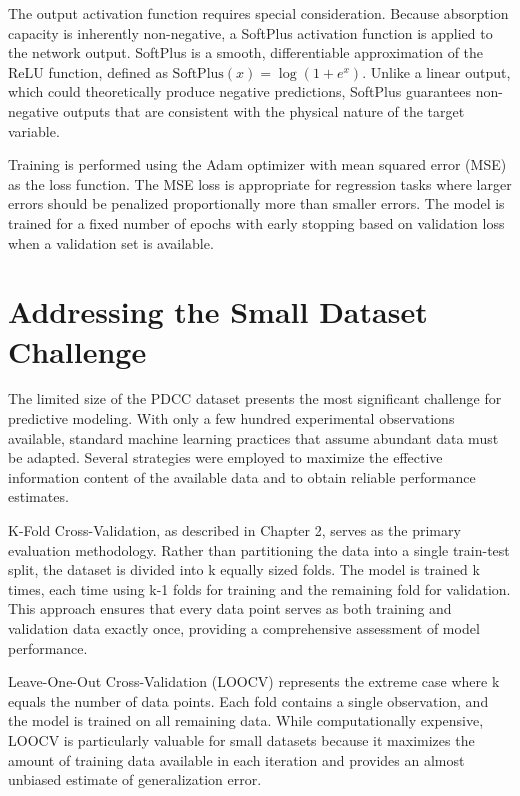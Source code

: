 The output activation function requires special consideration. Because absorption capacity is inherently non-negative, a SoftPlus activation function is applied to the network output. SoftPlus is a smooth, differentiable approximation of the ReLU function, defined as $\text{SoftPlus}(x) = \log(1 + e^x)$. Unlike a linear output, which could theoretically produce negative predictions, SoftPlus guarantees non-negative outputs that are consistent with the physical nature of the target variable.

Training is performed using the Adam optimizer with mean squared error (MSE) as the loss function. The MSE loss is appropriate for regression tasks where larger errors should be penalized proportionally more than smaller errors. The model is trained for a fixed number of epochs with early stopping based on validation loss when a validation set is available.

\section{Addressing the Small Dataset Challenge}
\label{sec:small_dataset}

The limited size of the PDCC dataset presents the most significant challenge for predictive modeling. With only a few hundred experimental observations available, standard machine learning practices that assume abundant data must be adapted. Several strategies were employed to maximize the effective information content of the available data and to obtain reliable performance estimates.

K-Fold Cross-Validation, as described in Chapter 2, serves as the primary evaluation methodology. Rather than partitioning the data into a single train-test split, the dataset is divided into k equally sized folds. The model is trained k times, each time using k-1 folds for training and the remaining fold for validation. This approach ensures that every data point serves as both training and validation data exactly once, providing a comprehensive assessment of model performance.

Leave-One-Out Cross-Validation (LOOCV) represents the extreme case where k equals the number of data points. Each fold contains a single observation, and the model is trained on all remaining data. While computationally expensive, LOOCV is particularly valuable for small datasets because it maximizes the amount of training data available in each iteration and provides an almost unbiased estimate of generalization error.

